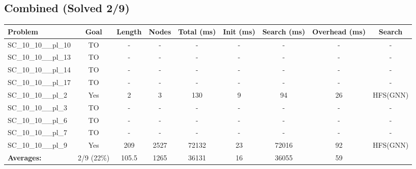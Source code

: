 \documentclass{article}
\begin{document}
\subsection*{Combined (Solved 2/9)}
\begin{tabular}{lcccccccc}
\toprule
Problem & Goal & Length & Nodes & Total (ms) & Init (ms) & Search (ms) & Overhead (ms) & Search \\
\midrule
SC\_10\_10\_\_pl\_10 & TO & - & - & - & - & - & - & - \\
SC\_10\_10\_\_pl\_13 & TO & - & - & - & - & - & - & - \\
SC\_10\_10\_\_pl\_14 & TO & - & - & - & - & - & - & - \\
SC\_10\_10\_\_pl\_17 & TO & - & - & - & - & - & - & - \\
SC\_10\_10\_\_pl\_2 & Yes & 2 & 3 & 130 & 9 & 94 & 26 & HFS(GNN) \\
SC\_10\_10\_\_pl\_3 & TO & - & - & - & - & - & - & - \\
SC\_10\_10\_\_pl\_6 & TO & - & - & - & - & - & - & - \\
SC\_10\_10\_\_pl\_7 & TO & - & - & - & - & - & - & - \\
SC\_10\_10\_\_pl\_9 & Yes & 209 & 2527 & 72132 & 23 & 72016 & 92 & HFS(GNN) \\
\textbf{Averages:} & 2/9 (22\%) & 105.5 & 1265 & 36131 & 16 & 36055 & 59 & \\
\bottomrule
\end{tabular}
\\[0.7cm]
\end{document}

